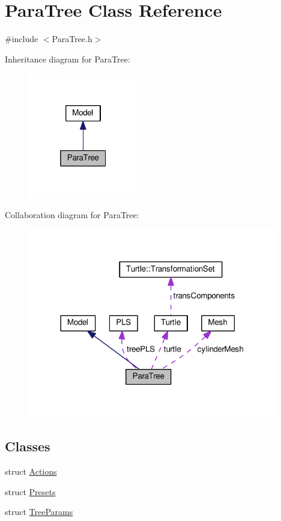 \hypertarget{class_para_tree}{}\section{Para\+Tree Class Reference}
\label{class_para_tree}


{\ttfamily \#include $<$Para\+Tree.\+h$>$}



Inheritance diagram for Para\+Tree\+:\nopagebreak
\begin{figure}[H]
\begin{center}
\leavevmode
\includegraphics[width=136pt]{class_para_tree__inherit__graph}
\end{center}
\end{figure}


Collaboration diagram for Para\+Tree\+:\nopagebreak
\begin{figure}[H]
\begin{center}
\leavevmode
\includegraphics[width=309pt]{class_para_tree__coll__graph}
\end{center}
\end{figure}
\subsection*{Classes}
\begin{DoxyCompactItemize}
\item 
struct \hyperlink{struct_para_tree_1_1_actions}{Actions}
\item 
struct \hyperlink{struct_para_tree_1_1_presets}{Presets}
\item 
struct \hyperlink{struct_para_tree_1_1_tree_params}{Tree\+Params}
\end{DoxyCompactItemize}
